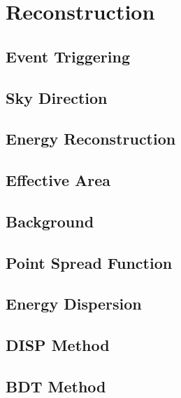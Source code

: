 \cleartooddpage[\thispagestyle{empty}]
\chapter{Reconstruction}

\section{Event Triggering}

\section{Sky Direction}

\section{Energy Reconstruction}

\section{Effective Area}

\section{Background}

\section{Point Spread Function}

\section{Energy Dispersion}

\section{DISP Method}

\section{BDT Method}

